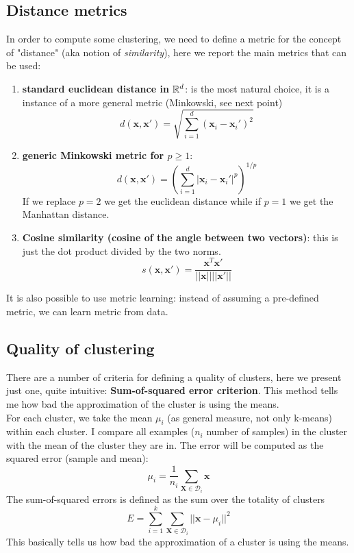     \subsection{Distance metrics}
        In order to compute some clustering, we need to define a metric for the concept of "distance" (aka notion of \textit{similarity}), here we report the main metrics that can be used:
        \begin{enumerate}
            \item \textbf{standard euclidean distance in $\mathbb{R}^d$}: is the most natural choice, it is a instance of a more general metric (Minkowski, see next point)
            $$d(\pmb{x}, \pmb{x}') = \sqrt{\sum _{i=1} ^ d (\pmb{x}_i - \pmb{x}_i ')^2}$$
            \item \textbf{generic Minkowski metric for $p \geq 1$}:
            $$d(\pmb{x}, \pmb{x}') = \left(\sum _{i=1} ^ d |\pmb{x}_i - \pmb{x}_i '|^p \right)^{1/p}$$ If we replace $p=2$ we get the euclidean distance while if $p=1$ we get the Manhattan distance.
            \item \textbf{Cosine similarity (cosine  of the angle between two vectors)}: this is just the dot product divided by the two norms.
            $$s(\pmb{x}, \pmb{x}') = \frac{\pmb{x}^T \pmb{x}'}{||\pmb{x}|| ||\pmb{x}'||}$$
      \end{enumerate}

      It is also possible to use metric learning: instead of assuming a pre-defined metric, we can learn metric from data.

    \subsection{Quality of clustering}
        There are a number of criteria for defining a quality of clusters, here we present just one, quite intuitive: \textbf{Sum-of-squared error criterion}. 
        This method tells me how bad the approximation of the cluster is using the means.\\

        For each cluster, we take the mean $\mu_i$ (as general measure, not only k-means) within each cluster. I compare all examples ($n_i$ number of samples) in the cluster with the mean of the cluster they are in. The error will be computed as the squared error (sample and mean): 
        $$\mu_i = \frac{1}{n_i} \sum_{\pmb{X} \in \mathcal{D}_i} \pmb{x}$$
        The sum-of-squared errors is defined as the sum over the totality of clusters
        $$E = \sum _{i=1}^k \sum_{\pmb{X} \in \mathcal{D}_i} || \pmb{x} - \mu_i|| ^ 2$$
        This basically tells us how bad the approximation of a cluster is using the means. 

